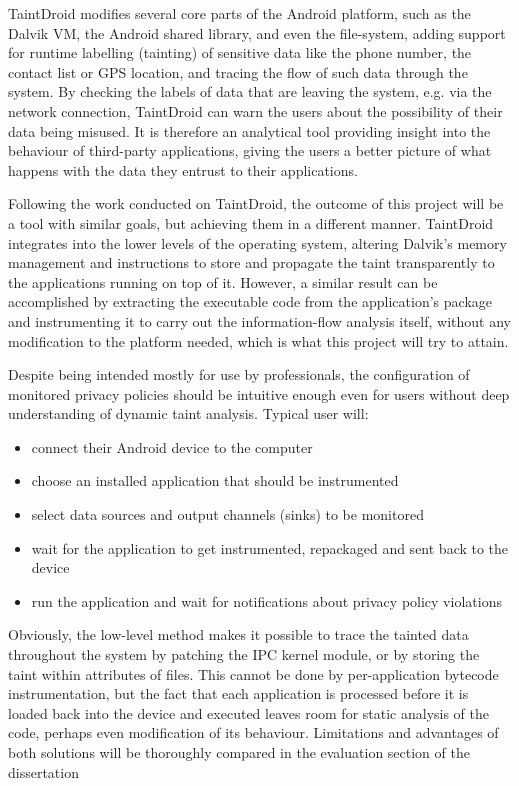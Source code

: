 \documentclass[12pt]{article}
\begin{document}
TaintDroid modifies several core parts of the Android platform, such as 
the Dalvik VM, the Android shared library, and even the file-system, 
adding support for runtime labelling (tainting) of sensitive data like the 
phone number, the contact list or GPS location, and tracing the flow of such 
data through the system. By checking the labels of data that are leaving the 
system, e.g. via the network connection, TaintDroid can warn the users about 
the possibility of their data being misused. It is therefore an analytical 
tool providing insight into the behaviour of third-party applications, giving 
the users a better picture of what happens with the data they entrust to 
their applications.

Following the work conducted on TaintDroid, the outcome of this project 
will be a tool with similar goals, but achieving them in a different 
manner. TaintDroid integrates into the lower levels of the operating 
system, altering Dalvik's memory management and instructions to store and
propagate the taint transparently to the applications running on top of 
it. However, a similar result can be accomplished by extracting the 
executable code from the application's package and instrumenting it to 
carry out the information-flow analysis itself, without any modification 
to the platform needed, which is what this project will try to attain.

Despite being intended mostly for use by professionals, the configuration 
of monitored privacy policies should be intuitive enough even for users 
without deep understanding of dynamic taint analysis. Typical user will:
\begin{itemize}
\item{connect their Android device to the computer}
\item{choose an installed application that should be instrumented}
\item{select data sources and output channels (sinks) to be monitored}
\item{wait for the application to get instrumented, repackaged and sent
      back to the device}
\item{run the application and wait for notifications about privacy policy
      violations}
\end{itemize}

Obviously, the low-level method makes it possible to trace the tainted data 
throughout the system by patching the IPC kernel module, or by storing the 
taint within attributes of files. This cannot be done by per-application 
bytecode instrumentation, but the fact that each application is processed 
before it is loaded back into the device and executed leaves room for static 
analysis of the code, perhaps even modification of its behaviour. Limitations 
and advantages of both solutions will be thoroughly compared in the evaluation 
section of the dissertation
\end{document}
